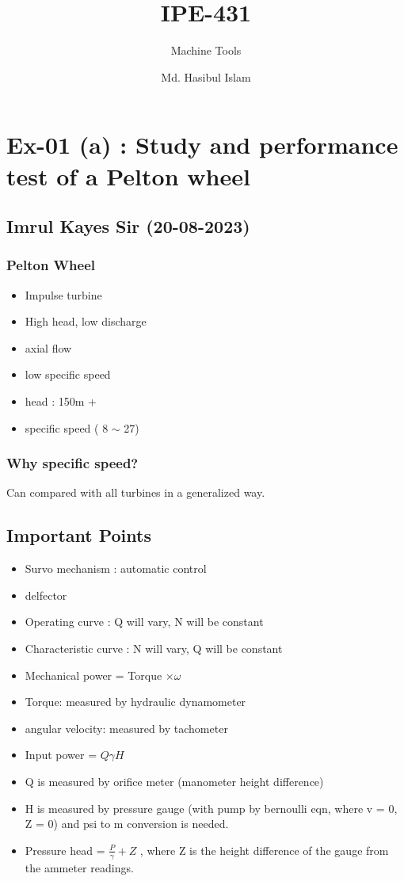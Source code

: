 \documentclass[14pt]{article}
\title{IPE-431}
\author{Md. Hasibul Islam}
\subtitle{Machine Tools}
\date{}
\begin{document}
    \section{Ex-01 (a) : Study and performance test of a Pelton wheel}
    \subsection{Imrul Kayes Sir (20-08-2023)}

    \begin{multicols}{2}
        \subsubsection*{Pelton Wheel}
        \begin{itemize}
            \item Impulse turbine 
            \item High head, low discharge 
            \item axial flow 
            \item low specific speed 
            \item head : 150m + 
            \item specific speed ( 8 $\sim$ 27)
        \end{itemize}
    
    \subsubsection{Why specific speed?}
    Can compared with all turbines in a generalized way.
    
    \subsection{Important Points}
    \begin{itemize}
        \item Survo mechanism : automatic control 
        \item delfector 
        \item Operating curve : Q will vary, N will be constant 
        \item Characteristic curve : N will vary, Q will be constant
        \item Mechanical power = Torque $\times \omega$ 
        \item Torque: measured by hydraulic dynamometer 
        \item angular velocity: measured by tachometer 
        \item Input power = $Q \gamma H$ 
        \item Q is measured by orifice meter (manometer height difference) 
        \item H is measured by pressure gauge (with pump by bernoulli eqn, where v = 0, Z = 0) and psi to m conversion is needed.
        \item Pressure head = $\frac{P}{\gamma} + Z$ , where Z is the height difference of the gauge from the ammeter readings.  
    \end{itemize}


\end{multicols}
\end{document}
